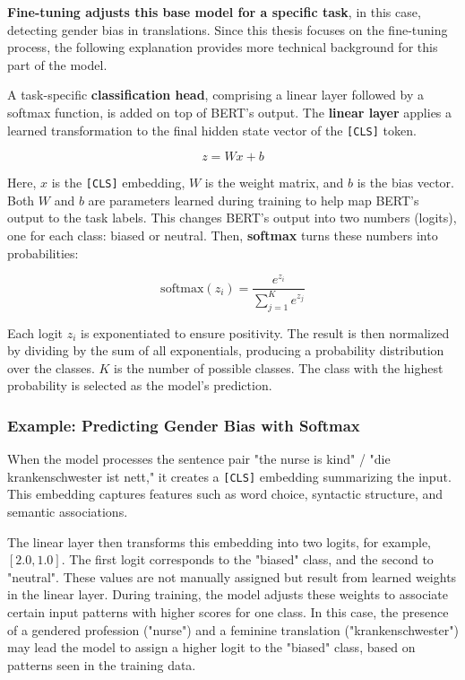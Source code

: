 \textbf{Fine-tuning adjusts this base model for a specific task}, in this case, detecting gender bias in translations. Since this thesis focuses on the fine-tuning process, the following explanation provides more technical background for this part of the model. 

A task-specific \textbf{classification head}, comprising a linear layer followed by a softmax function, is added on top of BERT’s output. The \textbf{linear layer} applies a learned transformation to the final hidden state vector of the \texttt{[CLS]} token. 

\[
z = Wx + b
\]

Here, \(x\) is the \texttt{[CLS]} embedding, \(W\) is the weight matrix, and \(b\) is the bias vector. Both \(W\) and \(b\) are parameters learned during training to help map BERT’s output to the task labels. This changes BERT’s output into two numbers (logits), one for each class: biased or neutral. Then, \textbf{softmax} turns these numbers into probabilities:

\[
\text{softmax}(z_i) = \frac{e^{z_i}}{\sum_{j=1}^{K} e^{z_j}}
\]

Each logit \( z_i \) is exponentiated to ensure positivity. The result is then normalized by dividing by the sum of all exponentials, producing a probability distribution over the classes. \( K \) is the number of possible classes. The class with the highest probability is selected as the model’s prediction.

\subsubsection{Example: Predicting Gender Bias with Softmax}
When the model processes the sentence pair "the nurse is kind" / "die krankenschwester ist nett," it creates a \texttt{[CLS]} embedding summarizing the input. This embedding captures features such as word choice, syntactic structure, and semantic associations. 

The linear layer then transforms this embedding into two logits, for example, \([2.0, 1.0]\). The first logit corresponds to the "biased" class, and the second to "neutral". These values are not manually assigned but result from learned weights in the linear layer. During training, the model adjusts these weights to associate certain input patterns with higher scores for one class. In this case, the presence of a gendered profession ("nurse") and a feminine translation ("krankenschwester") may lead the model to assign a higher logit to the "biased" class, based on patterns seen in the training data.

